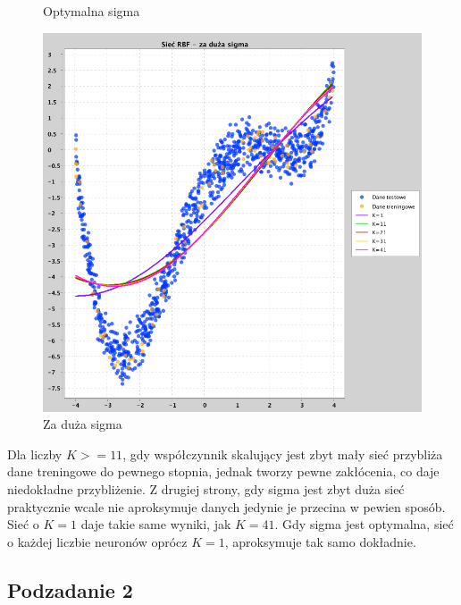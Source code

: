 \documentclass[a4paper, portrait,11pt]{article}
\begin{document}
\begin{figure}[!htb]
\begin{minipage}{0.33\textwidth}
    \caption{\label{fig:1optimal}Optymalna sigma}
  \end{minipage}
  \begin{minipage}{0.33\textwidth}
    \centering
    \includegraphics[width=1\linewidth]{../data/approximation3/1/big.png}
    \caption{\label{fig:1big}Za duża sigma}
  \end{minipage}\hfill
\end{figure}
Dla liczby $K >= 11$, gdy współczynnik skalujący 
jest zbyt mały sieć przybliża dane treningowe do pewnego stopnia, 
jednak tworzy pewne zakłócenia, co daje niedokładne przybliżenie.
Z drugiej strony, gdy sigma jest zbyt duża sieć praktycznie wcale nie aproksymuje danych jedynie je przecina w pewien sposób.
Sieć o $K=1$ daje takie same wyniki, jak $K=41$.
Gdy sigma jest optymalna, sieć o każdej liczbie neuronów oprócz $K=1$, aproksymuje tak samo dokładnie.

\subsection{Podzadanie 2}
\end{document}
